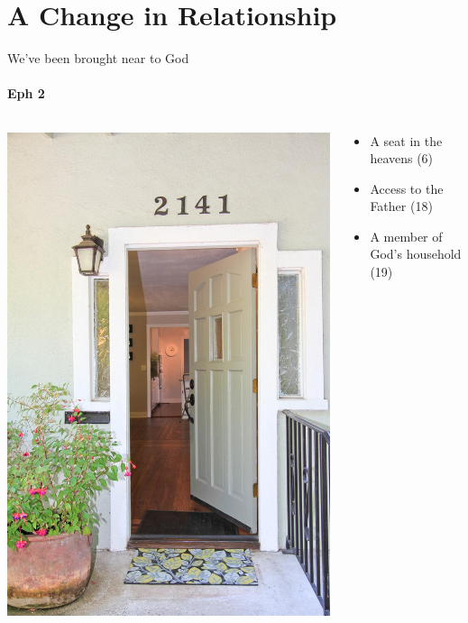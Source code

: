 \section{A Change in Relationship}

\begin{frame}{We've been brought near to God}
\framesubtitle{Eph 2}

\begin{columns}[c]
\begin{column}{0.4\textwidth}
	\includegraphics[width=\columnwidth]{figures/openDoor.jpg}
\end{column}
\begin{column}{0.6\textwidth}
	\begin{itemize}
		\item A seat in the heavens (6)
		\item Access to the Father (18)
		\item A member of God's household (19)
	\end{itemize}
\end{column}
\end{columns}


\end{frame}
